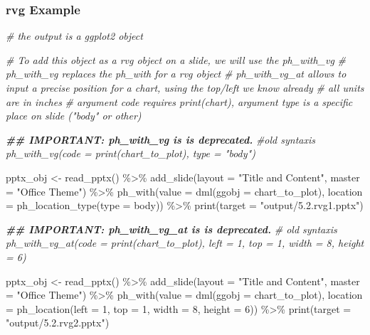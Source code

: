 \documentclass[
]{book}
\newenvironment{Shaded}{\begin{snugshade}}{\end{snugshade}}
\newcommand{\AttributeTok}[1]{\textcolor[rgb]{0.77,0.63,0.00}{#1}}
\newcommand{\CommentTok}[1]{\textcolor[rgb]{0.56,0.35,0.01}{\textit{#1}}}
\newcommand{\DecValTok}[1]{\textcolor[rgb]{0.00,0.00,0.81}{#1}}
\newcommand{\DocumentationTok}[1]{\textcolor[rgb]{0.56,0.35,0.01}{\textbf{\textit{#1}}}}
\newcommand{\FunctionTok}[1]{\textcolor[rgb]{0.00,0.00,0.00}{#1}}
\newcommand{\NormalTok}[1]{#1}
\newcommand{\OtherTok}[1]{\textcolor[rgb]{0.56,0.35,0.01}{#1}}
\newcommand{\SpecialCharTok}[1]{\textcolor[rgb]{0.00,0.00,0.00}{#1}}
\newcommand{\StringTok}[1]{\textcolor[rgb]{0.31,0.60,0.02}{#1}}
\begin{document}
\hypertarget{rvg-example}{%
\subsubsection{rvg Example}\label{rvg-example}}

\begin{Shaded}
\begin{Highlighting}[]
\CommentTok{\# the output is a ggplot2 object}

\CommentTok{\# To add this object as a rvg object on a slide, we will use the ph\_with\_vg}
\CommentTok{\# ph\_with\_vg replaces the ph\_with for a rvg object}
\CommentTok{\# ph\_with\_vg\_at allows to input a precise position for a chart, using the top/left we know already}
\CommentTok{\# all units are in inches}
\CommentTok{\# argument code requires print(chart), argument type is a specific place on slide ("body" or other)}

\DocumentationTok{\#\# IMPORTANT: ph\_with\_vg is is deprecated.}
\CommentTok{\#old syntaxis ph\_with\_vg(code = print(chart\_to\_plot), type = "body") }

\NormalTok{pptx\_obj }\OtherTok{\textless{}{-}} \FunctionTok{read\_pptx}\NormalTok{() }\SpecialCharTok{\%\textgreater{}\%}
  \FunctionTok{add\_slide}\NormalTok{(}\AttributeTok{layout =} \StringTok{"Title and Content"}\NormalTok{, }\AttributeTok{master =} \StringTok{"Office Theme"}\NormalTok{) }\SpecialCharTok{\%\textgreater{}\%}
  \FunctionTok{ph\_with}\NormalTok{(}\AttributeTok{value =} \FunctionTok{dml}\NormalTok{(}\AttributeTok{ggobj =}\NormalTok{ chart\_to\_plot), }\AttributeTok{location  =}  \FunctionTok{ph\_location\_type}\NormalTok{(}\AttributeTok{type =} \StringTok{\textquotesingle{}body\textquotesingle{}}\NormalTok{)) }\SpecialCharTok{\%\textgreater{}\%}
  \FunctionTok{print}\NormalTok{(}\AttributeTok{target =} \StringTok{"output/5.2.rvg1.pptx"}\NormalTok{) }

\DocumentationTok{\#\# IMPORTANT: ph\_with\_vg\_at is is deprecated.}
\CommentTok{\# old syntaxis ph\_with\_vg\_at(code = print(chart\_to\_plot), left = 1, top = 1, width = 8, height = 6) }

\NormalTok{pptx\_obj }\OtherTok{\textless{}{-}} \FunctionTok{read\_pptx}\NormalTok{() }\SpecialCharTok{\%\textgreater{}\%}
  \FunctionTok{add\_slide}\NormalTok{(}\AttributeTok{layout =} \StringTok{"Title and Content"}\NormalTok{, }\AttributeTok{master =} \StringTok{"Office Theme"}\NormalTok{) }\SpecialCharTok{\%\textgreater{}\%}
  \FunctionTok{ph\_with}\NormalTok{(}\AttributeTok{value =} \FunctionTok{dml}\NormalTok{(}\AttributeTok{ggobj =}\NormalTok{ chart\_to\_plot), }\AttributeTok{location =}  \FunctionTok{ph\_location}\NormalTok{(}\AttributeTok{left =} \DecValTok{1}\NormalTok{, }\AttributeTok{top =} \DecValTok{1}\NormalTok{, }\AttributeTok{width =} \DecValTok{8}\NormalTok{, }\AttributeTok{height =} \DecValTok{6}\NormalTok{))  }\SpecialCharTok{\%\textgreater{}\%}
  \FunctionTok{print}\NormalTok{(}\AttributeTok{target =} \StringTok{"output/5.2.rvg2.pptx"}\NormalTok{) }


\end{Highlighting}
\end{Shaded}
\end{document}
